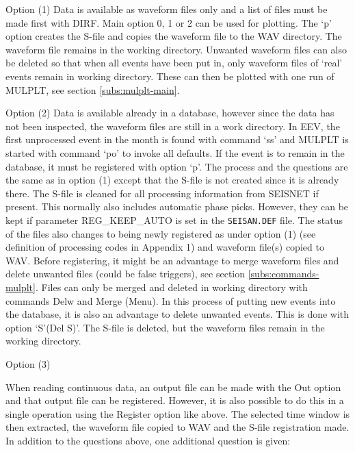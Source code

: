 Option (1) \newline
Data is available as waveform files only and a list of files must be 
made first with DIRF. Main option 0, 1 or 2 can be used for plotting. 
The `p' option creates the S-file and copies the waveform file to 
the WAV directory. The waveform file remains in the working directory. 
Unwanted waveform files can also be deleted so that when all events 
have been put in, only waveform files of `real' events remain in working 
directory. These can then be plotted with one run of MULPLT, see 
section \ref{subs:mulplt-main}.  

Option (2) \newline
Data is available already in a database, however since the data has not been inspected, the waveform files are still in a work directory. In EEV, the first unprocessed event in the month is found 
with command `ss' and MULPLT is started with command `po' to invoke all defaults. If the event is to remain in the database, it must be registered with option `p'. The process and the questions are the same as in option (1) except that the S-file is not created since it is already there. The S-file is cleaned for all processing information from SEISNET if present. This normally also includes automatic phase picks. However, they can be kept if parameter REG\_KEEP\_AUTO is set in the \texttt{SEISAN.DEF} file. The status of the files also changes to being newly registered as under option (1) (see definition of processing codes in Appendix 1) and waveform file(s) copied to WAV. Before registering, it might be an advantage to merge waveform files and delete unwanted files (could be false triggers), see section \ref{subs:commands-mulplt}. Files can only be merged and deleted in working directory with commands Delw and Merge (Menu). In this process of putting new events into the database, it is also an advantage to delete unwanted events. This is done with option `S'(Del S)'. The S-file is deleted, but the waveform files remain in the working directory. 

Option (3) \newline

When reading continuous data, an output file can be made with the Out option and that output file can be registered. However, it is also possible to do this in a single operation using the Register option like above. The selected time window is then extracted, the waveform file copied to WAV and the S-file registration made. In addition to the questions above, one additional question is given: 

